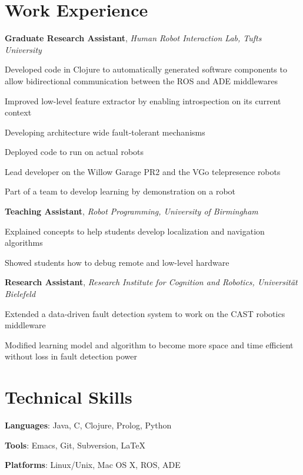 \documentclass[10pt, letter]{article}
\newcommand{\years}[1]{\marginnote{\scriptsize #1}}
\newenvironment{itemize*}{
  \begin{itemize}
    \setlength{\itemsep}{0pt}
    \setlength{\parskip}{-1pt}
    \setlength{\parsep}{-1pt}
  }{
  \end{itemize}
}
\begin{document}
\section*{Work Experience}
\years{2012--2013}
\textbf{Graduate Research Assistant}, \textsl{Human Robot Interaction Lab, Tufts University}
\begin{itemize*}
\item Developed code in Clojure to automatically generated software
  components to allow bidirectional communication between the ROS and
  ADE middlewares
\item Improved low-level feature extractor by enabling introspection on its current context
\item Developing architecture wide fault-tolerant mechanisms
\item Deployed code to run on actual robots
\item Lead developer on the Willow Garage PR2 and the VGo telepresence robots
\item Part of a team to develop learning by demonstration on a robot
\end{itemize*}

\years{2012}
\textbf{Teaching Assistant}, \textsl{Robot Programming, University of Birmingham}
\begin{itemize*}
\item Explained concepts to help students develop localization and navigation algorithms
\item Showed students how to debug remote and low-level hardware
\end{itemize*}

\years{2011}
\textbf{Research Assistant}, \textsl{Research Institute for Cognition and Robotics, Universität Bielefeld}
\begin{itemize*}
\item Extended a data-driven fault detection system to work on the CAST robotics middleware
\item Modified learning model and algorithm to become more space and time efficient without loss in fault detection power
\end{itemize*}

\section*{Technical Skills}
\begin{itemize*}
  \item[] \textbf{Languages}: Java, C, Clojure, Prolog, Python
  \item[] \textbf{Tools}: Emacs, Git, Subversion, \LaTeX
  \item[] \textbf{Platforms}: Linux/Unix, Mac OS X, ROS, ADE
\end{itemize*}
 
\end{document}
